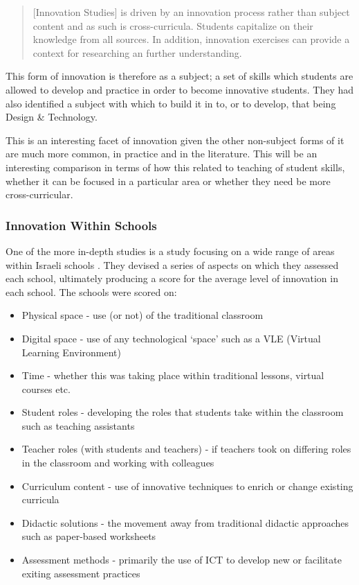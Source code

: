 \documentclass[11pt]{article}
\begin{document}
\begin{quote}
[Innovation Studies] is driven by an innovation process rather than subject content and as such is cross-curricula. Students capitalize on their knowledge from all sources. In addition, innovation exercises can provide a context for researching an further understanding. 
\citep{thorsteinsson2005innovation}
\end{quote} 

This form of innovation is therefore as a subject; a set of skills which students are allowed to develop and practice in order to become innovative students. They had also identified a subject with which to build it in to, or to develop, that being Design \& Technology.

This is an interesting facet of innovation given the other non-subject forms of it are much more common, in practice and in the literature. This will be an interesting comparison in terms of how this related to teaching of student skills, whether it can be focused in a particular area or whether they need be more cross-curricular.

\subsubsection{Innovation Within Schools}
One of the more in-depth studies is a study focusing on a wide range of areas within Israeli schools \citep{tubin2003domains}. They devised a series of aspects on which they assessed each school, ultimately producing a score for the average level of innovation in each school. The schools were scored on:

\begin{itemize}
	\item Physical space - use (or not) of the traditional classroom
	\item Digital space - use of any technological `space' such as a VLE (Virtual Learning Environment)
	\item Time - whether this was taking place within traditional lessons, virtual courses etc.
	\item Student roles - developing the roles that students take within the classroom such as teaching assistants
	\item Teacher roles (with students and teachers) - if teachers took on differing roles in the classroom and working with colleagues
	\item Curriculum content - use of innovative techniques to enrich or change existing curricula
	\item Didactic solutions - the movement away from traditional didactic approaches such as paper-based worksheets
	\item Assessment methods - primarily the use of ICT to develop new or facilitate exiting assessment practices
\end{itemize}
\end{document}
